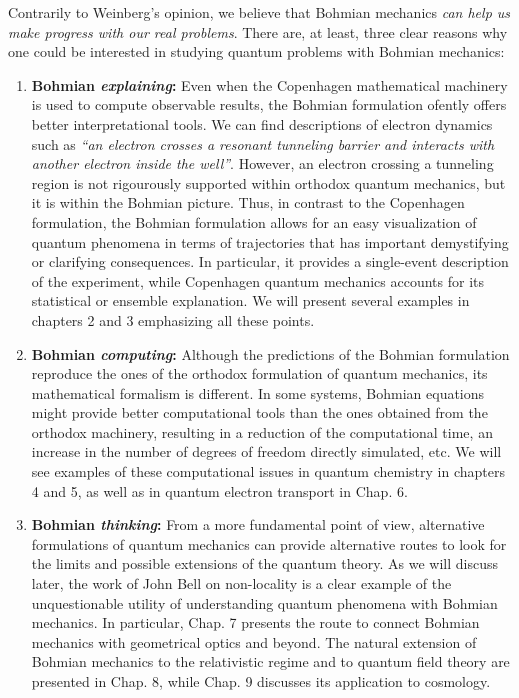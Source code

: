 \documentclass[onecolumn,nofootinbib, secnumarabic, amsmath, nobibnotes,11pt,aps,pra]{revtex4-1}
\begin{document}
Contrarily to Weinberg's opinion, we believe that Bohmian mechanics \emph{can help us make progress with our real problems}. There are, at least, three clear reasons why one could be interested in studying quantum problems with Bohmian mechanics:
\begin{enumerate}
\item \textbf{Bohmian \emph{explaining}:} Even when the Copenhagen mathematical machinery is used to compute observable results, the Bohmian formulation ofently offers better interpretational tools. We can find descriptions of electron dynamics such as \emph{``an electron crosses a resonant tunneling barrier and interacts with another electron inside the well''}. However, an electron crossing a tunneling region is not rigourously supported within orthodox quantum mechanics, but it is within the Bohmian picture.
Thus, in contrast to the Copenhagen formulation, the Bohmian formulation allows for an easy visualization of quantum phenomena in terms of trajectories that has important demystifying or clarifying consequences. In particular, it provides a single-event description of the experiment, while Copenhagen quantum mechanics accounts for its statistical or ensemble explanation. We will present several examples in chapters 2 and 3 emphasizing all these points. \\

\item \textbf{Bohmian \emph{computing}:} Although the predictions of the Bohmian formulation reproduce the ones of the orthodox formulation of quantum mechanics, its mathematical formalism is different. In some systems, Bohmian equations might provide better computational tools than the ones obtained from the orthodox machinery, resulting in a reduction of the computational time, an increase in the number of degrees of freedom directly simulated, etc.  We will see examples of these computational issues in quantum chemistry in chapters 4 and 5, as well as in quantum electron transport in Chap. 6.\\


\item \textbf{Bohmian \emph{thinking}:} From a more fundamental point of view, alternative formulations of quantum mechanics can provide alternative routes to look for the limits and possible extensions of the quantum theory. As we will discuss later, the work of John Bell on non-locality is a clear example of the unquestionable utility of understanding quantum phenomena with Bohmian mechanics. In particular, Chap. 7 presents the route to connect Bohmian mechanics with geometrical optics and beyond. The natural extension of Bohmian mechanics to the relativistic regime and to quantum field theory are presented in Chap. 8, while Chap. 9 discusses its application to cosmology.
\end{enumerate}
\end{document}
